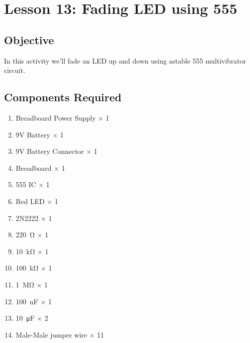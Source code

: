 \clearpage
\section{Lesson 13: Fading LED using 555}
\subsection{Objective}
In this activity we'll fade an LED up and down using astable 555 multivibrator circuit.
\subsection{Components Required}
\begin{enumerate}
    \item Breadboard Power Supply $\times$ 1
    \item 9V Battery $\times$ 1
    \item 9V Battery Connector $\times$ 1
    \item Breadboard $\times$ 1
    \item 555 IC $\times$ 1
    \item Red LED $\times$ 1
    \item 2N2222 $\times$ 1
    \item \SI{220}{\ohm} $\times$ 1
    \item \SI{10}{\kilo\ohm} $\times$ 1
    \item \SI{100}{\kilo\ohm} $\times$ 1
    \item \SI{1}{\Mohm} $\times$ 1
    \item \SI{100}{\nano\farad} $\times$ 1
    \item \SI{10}{\micro\farad} $\times$ 2
    \item Male-Male jumper wire $\times$ 11
\end{enumerate}
